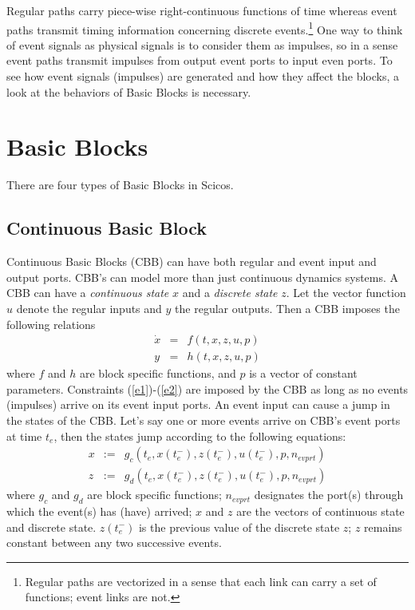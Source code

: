 \documentclass{book}
\begin{document}
Regular paths carry piece-wise right-continuous functions of time
whereas event paths transmit timing information concerning discrete
events.\footnote{Regular paths are vectorized in a sense that each
link can carry  
a set of functions; event links are not.}
One way to think of event signals as physical signals is to
consider them as impulses, so in a sense event paths transmit
impulses from output event ports to input even ports. To see how event
signals (impulses) are generated and how they affect the blocks, a
look at the behaviors of Basic Blocks is necessary.



\section{Basic Blocks}
There are four types of Basic Blocks in Scicos.

\subsection{Continuous Basic Block}
Continuous Basic Blocks (CBB) can have both regular and event input and output
ports. CBB's can model more than just continuous 
dynamics systems. A CBB can have a {\em continuous state} $x$ and a 
{\em discrete state}
$z$. Let the vector function $u$ denote the regular inputs and $y$ the regular
outputs. Then a CBB imposes the following relations
\begin{eqnarray}
\dot{x} &=& f(t,x,z,u,p) \label{e1}\\
y&=&h(t,x,z,u,p) \label{e2}
\end{eqnarray}
where $f$ and $h$ are block specific functions, and $p$ is a vector of
constant parameters. Constraints (\ref{e1})-(\ref{e2}) are imposed by
the CBB as long as no events (impulses) arrive on its event input ports. An
event input can cause a jump in the states of the CBB. Let's
say one or more events  arrive on  CBB's event ports at time $t_e$, then
the states jump according to the following equations:
\begin{eqnarray}
x &:=& g_c(t_e,x(t_e^-),z(t_e^-),u(t_e^-),p,n_{evprt}) \label{e11}\\
z &:=& g_d(t_e,x(t_e^-),z(t_e^-),u(t_e^-),p,n_{evprt}) \label{e12}
\end{eqnarray}
where $g_c$ and $g_d$ are block specific functions; $n_{evprt}$ 
designates the port(s)
through which the event(s) has (have) arrived; ${x}$ and ${z}$ are
the vectors of continuous state and
discrete state. $z(t_e^-)$ is the previous value of the discrete state $z$;
$z$ remains constant between any two successive events. 
\end{document}
